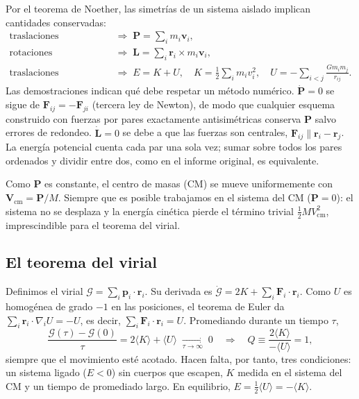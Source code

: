 \documentclass[11pt,a4paper]{article}
\newcommand{\vect}[1]{\mathbf{#1}}
\begin{document}
Por el teorema de Noether, las simetrías de un sistema aislado implican cantidades
conservadas:
\begin{align}
  \text{traslaciones} &\;\Rightarrow\; \vect P=\sum_i m_i\vect v_i, \\
  \text{rotaciones}    &\;\Rightarrow\; \vect L=\sum_i \vect r_i\times m_i\vect v_i, \\
  \text{traslaciones temporales}  &\;\Rightarrow\; E=K+U,\quad K=\tfrac12\sum_i m_i v_i^2,\quad
                        U=-\sum_{i<j}\frac{G m_i m_j}{r_{ij}} .
  \label{eq:energy}
\end{align}
Las demostraciones indican qué debe respetar un método numérico. $\dot{\vect P}=0$ se
sigue de $\vect F_{ij}=-\vect F_{ji}$ (tercera ley de Newton), de modo que cualquier esquema
construido con fuerzas por pares exactamente antisimétricas conserva $\vect P$ salvo
errores de redondeo. $\dot{\vect L}=0$ se debe a que las fuerzas son centrales,
$\vect F_{ij}\parallel\vect r_i-\vect r_j$. La energía potencial cuenta cada par una sola
vez; sumar sobre todos los pares ordenados y dividir entre dos, como en el informe
original, es equivalente.

Como $\vect P$ es constante, el centro de masas (CM) se mueve uniformemente con
$\vect V_\text{cm}=\vect P/M$. Siempre que es posible trabajamos en el sistema del CM
($\vect P=0$): el sistema no se desplaza y la energía cinética pierde el término trivial
$\tfrac12 M V_\text{cm}^2$, imprescindible para el teorema del virial.

\subsection{El teorema del virial}\label{sec:virial}

Definimos el virial $\mathcal G=\sum_i\vect p_i\cdot\vect r_i$. Su derivada es
$\dot{\mathcal G}=2K+\sum_i\vect F_i\cdot\vect r_i$. Como $U$ es homogénea de grado $-1$ en
las posiciones, el teorema de Euler da $\sum_i\vect r_i\cdot\nabla_i U=-U$, es decir,
$\sum_i\vect F_i\cdot\vect r_i=U$. Promediando durante un tiempo $\tau$,
\begin{equation}
  \frac{\mathcal G(\tau)-\mathcal G(0)}{\tau}=2\langle K\rangle+\langle U\rangle
  \;\xrightarrow[\tau\to\infty]{}\;0
  \quad\Longrightarrow\quad
  Q\equiv\frac{2\langle K\rangle}{-\langle U\rangle}=1,
  \label{eq:virial}
\end{equation}
siempre que el movimiento esté acotado. Hacen falta, por tanto, tres condiciones: un
sistema ligado ($E<0$) sin cuerpos que escapen, $K$ medida en el sistema del CM y un tiempo
de promediado largo. En equilibrio, $E=\tfrac12\langle U\rangle=-\langle K\rangle$.
\end{document}
